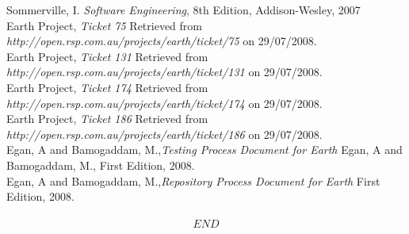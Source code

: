 \documentclass[10pt,oneside]{article}
\begin{document}
Sommerville, I. \textit{Software Engineering}, 8th Edition,  Addison-Wesley, 2007\\
\newline
Earth Project, \textit{Ticket 75} Retrieved from \emph{http://open.rsp.com.au/projects/earth/ticket/75} on 29/07/2008.\\
\newline
Earth Project, \textit{Ticket 131} Retrieved from \emph{http://open.rsp.com.au/projects/earth/ticket/131} on 29/07/2008.\\
\newline
Earth Project, \textit{Ticket 174} Retrieved from \emph{http://open.rsp.com.au/projects/earth/ticket/174} on 29/07/2008.\\
\newline
Earth Project, \textit{Ticket 186} Retrieved from \emph{http://open.rsp.com.au/projects/earth/ticket/186} on 29/07/2008.\\
\newline
Egan, A and Bamogaddam, M.,\textit{Testing Process Document for Earth} Egan, A and Bamogaddam, M., First Edition, 2008.\\
\newline
Egan, A and Bamogaddam, M.,\textit{Repository Process Document for Earth}  First Edition, 2008.\\

\paragraph{}

\[ END\]
\end{document}
